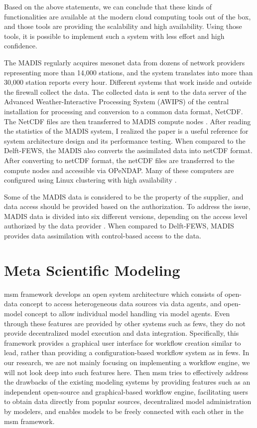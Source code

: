 Based on the above statements, we can conclude that these kinds of functionalities are available at the modern cloud computing tools out of the box, and those tools are providing the scalability and high availability. Using those tools, it is possible to implement such a system with less effort and high confidence.

The MADIS regularly acquires mesonet data from dozens of network providers representing more than 14,000 stations, and the system translates into more than 30,000 station reports every hour. Different systems that work inside and outside the firewall collect the data. The collected data is sent to the data server of the Advanced Weather-Interactive Processing System (AWIPS) of the central installation for processing and conversion to a common data format, NetCDF. The NetCDF files are then transferred to MADIS compute nodes \cite{Macdermaid2005ArchitectureP2.39}. After reading the statistics of the MADIS system, I realized the paper is a useful reference for system architecture design and its performance testing. When compared to the Delft-FEWS, the MADIS also converts the assimilated data into netCDF format. After converting to netCDF format, the netCDF files are transferred to the compute nodes and accessible via OPeNDAP. Many of these computers are configured using Linux clustering with high availability \cite{Macdermaid2005ArchitectureP2.39}.

Some of the MADIS data is considered to be the property of the supplier, and data access should be provided based on the authorization. To address the issue, MADIS data is divided into six different versions, depending on the access level authorized by the data provider \cite{Macdermaid2005ArchitectureP2.39}. When compared to Delft-FEWS, MADIS provides data assimilation with control-based access to the data.

\section{Meta Scientific Modeling}
\label{se:msm}

\acrfull{msm} framework develops an open system architecture which consists of open-data concept to access heterogeneous data sources via data agents, and open-model concept to allow individual model handling via model agents. Even through these features are provided by other systems such as \acrshort{fews}, they do not provide decentralized model execution and data integration. Specifically, this framework provides a graphical user interface for workflow creation similar to \acrshort{lead}, rather than providing a configuration-based workflow system as in \acrshort{fews}. In our research, we are not mainly focusing on implementing a workflow engine, we will not look deep into such features here.
Then \acrshort{msm} tries to effectively address the drawbacks of the existing modeling systems by providing features such as an independent open-source and graphical-based workflow engine, facilitating  users to obtain data directly from popular sources, decentralized model administration by modelers, and enables models to be freely connected with each other in the \acrshort{msm} framework.

